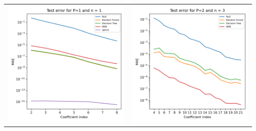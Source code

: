 \documentclass[a1paper]{tikzposter}
\begin{document}
\begin{columns}
{    %

    {
        \begin{center}
            \begin{tabular}{cc}
                \begin{minipage}{0.16\textwidth}
                    \includegraphics[width=\linewidth]{Images/MLP1n1.png}
                \end{minipage} &
                \begin{minipage}{0.16\textwidth}
                    \includegraphics[width=\linewidth]{Images/MLP2n3.png}

\end{minipage}
\end{tabular}
\end{center}}}
\end{columns}
\end{document}
